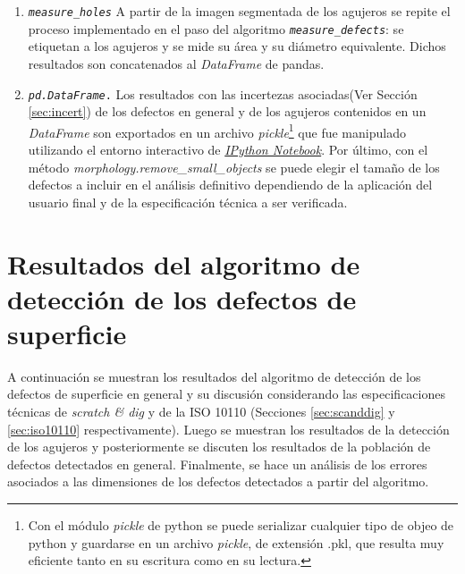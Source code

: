 \begin{enumerate}
\item \texttt{\textit{measure\_holes}} A partir de la imagen segmentada de los agujeros se repite el proceso implementado en el paso del algoritmo \texttt{\textit{measure\_defects}}: se etiquetan a los agujeros y se mide su área y su diámetro equivalente. Dichos resultados son concatenados al \textit{DataFrame} de pandas.
\item \texttt{\textit{pd.DataFrame}.} Los resultados con las incertezas asociadas(Ver Sección \ref{sec:incert}) de los defectos en general y de los agujeros contenidos en un \textit{DataFrame} son exportados en un archivo \textit{pickle}\footnote{Con el módulo \textit{pickle} de python se puede serializar cualquier tipo de objeo de python y guardarse en un archivo \textit{pickle}, de extensión .pkl, que resulta muy eficiente tanto en su escritura como en su lectura.} que fue manipulado utilizando el entorno interactivo de \href{https://ipython.org/notebook.html}{\textit{IPython Notebook}}. Por último, con el método \textit{morphology.remove\_small\_objects} se puede elegir el tamaño de los defectos a incluir en el análisis definitivo dependiendo de la aplicación del usuario final y de la especificación técnica a ser verificada.
\end{enumerate}


\singlespacing
\section{Resultados del algoritmo de detección de los defectos de superficie \href{https://github.com/jrr1984/defects_analysis/blob/master/Defects\%20analysis.ipynb}{\faGithub}}
\label{sec:resgrl}


\hspace{0.5cm}A continuación se muestran los resultados del algoritmo de detección de los defectos de superficie en general y su discusión considerando las especificaciones técnicas de \textit{scratch \& dig} y de la ISO 10110 (Secciones \ref{sec:scanddig} y \ref{sec:iso10110} respectivamente). Luego se muestran los resultados de la detección de los agujeros y posteriormente se discuten los resultados de la población de defectos detectados en general. Finalmente, se hace un análisis de los errores asociados a las dimensiones de los defectos detectados a partir del algoritmo.


